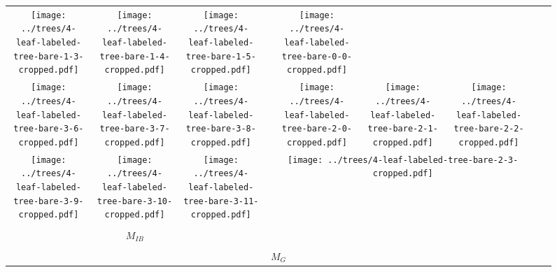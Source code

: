 \documentclass[border=10pt,varwidth=30cm]{standalone}
\newcommand{\genmodel}{\ensuremath{M_{G}}\xspace}
\newcommand{\bimodel}{\ensuremath{M_{IB}}\xspace}
\newcommand{\pltwidth}{0.1}
\begin{document}
\begin{figure}
\begin{tabular}{@{}|ccc|cccccc@{}}
        \texttt{[image: ../trees/4-leaf-labeled-tree-bare-1-3-cropped.pdf]}
        &
        \texttt{[image: ../trees/4-leaf-labeled-tree-bare-1-4-cropped.pdf]}
        &
        \texttt{[image: ../trees/4-leaf-labeled-tree-bare-1-5-cropped.pdf]}
        &
        &
        \texttt{[image: ../trees/4-leaf-labeled-tree-bare-0-0-cropped.pdf]}
        \\
        \texttt{[image: ../trees/4-leaf-labeled-tree-bare-3-6-cropped.pdf]}
        &
        \texttt{[image: ../trees/4-leaf-labeled-tree-bare-3-7-cropped.pdf]}
        &
        \texttt{[image: ../trees/4-leaf-labeled-tree-bare-3-8-cropped.pdf]}
        &
        &
        \texttt{[image: ../trees/4-leaf-labeled-tree-bare-2-0-cropped.pdf]}
        &
        \texttt{[image: ../trees/4-leaf-labeled-tree-bare-2-1-cropped.pdf]}
        &
        \texttt{[image: ../trees/4-leaf-labeled-tree-bare-2-2-cropped.pdf]}
        &
        &
        \\
        \texttt{[image: ../trees/4-leaf-labeled-tree-bare-3-9-cropped.pdf]}
        &
        \texttt{[image: ../trees/4-leaf-labeled-tree-bare-3-10-cropped.pdf]}
        &
        \texttt{[image: ../trees/4-leaf-labeled-tree-bare-3-11-cropped.pdf]}
        &
        &
        \multicolumn{3}{c}{\texttt{[image: ../trees/4-leaf-labeled-tree-bare-2-3-cropped.pdf]}}
        &
        &
        \\[2ex]
        \cline{1-3}
        \multicolumn{3}{c}{} & & & & & & \\[-1ex]
        \multicolumn{3}{c}{\Huge \bimodel} & & & & & & \\[3ex]
        \cline{1-9}
        \multicolumn{9}{c}{} \\[-1ex]
        \multicolumn{9}{c}{\Huge \genmodel} \\[1ex]
    \end{tabular}
\end{figure}
\end{document}
